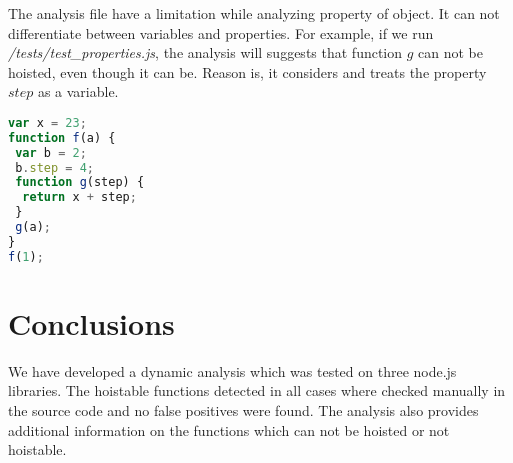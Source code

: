 \documentclass[accentcolor=tud0b,12pt,paper=a4]{tudreport}
\begin{document}
The analysis file have a limitation while analyzing property of object. It can not differentiate between variables and properties. For example, if we run \emph{/tests/test\_properties.js}, the analysis will suggests that function $g$ can not be hoisted, even though it can be. Reason is, it considers and treats the property $step$ as a variable.
\begin{lstlisting}[language=JavaScript]
var x = 23;
function f(a) {
 var b = 2;
 b.step = 4;
 function g(step) {
  return x + step;
 }
 g(a);
}
f(1);
\end{lstlisting}


\chapter{Conclusions}
We have developed a dynamic analysis which was tested on three node.js libraries. The hoistable functions detected in all cases where checked manually in the source code and no false positives were found. The analysis also provides additional information on the functions which can not be hoisted or not hoistable. 
\end{document}
